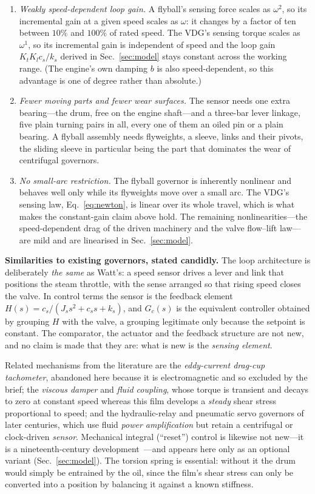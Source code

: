 \documentclass[conference]{IEEEtran}
\begin{document}
\begin{enumerate}
\item \emph{Weakly speed-dependent loop gain.} A flyball's sensing force scales as
$\omega^{2}$, so its incremental gain at a given speed scales as $\omega$: it
changes by a factor of ten between $10\%$ and $100\%$ of rated speed. The VDG's
sensing torque scales as $\omega^{1}$, so its incremental gain is independent of
speed and the loop gain $K_tK_lc_s/k_s$ derived in Sec.~\ref{sec:model} stays
constant across the working range. (The engine's own damping $b$ is also
speed-dependent, so this advantage is one of degree rather than absolute.)
\item \emph{Fewer moving parts and fewer wear surfaces.} The sensor needs one extra
bearing---the drum, free on the engine shaft---and a three-bar lever linkage, five
plain turning pairs in all, every one of them an oiled pin or a plain bearing. A
flyball assembly needs flyweights, a sleeve, links and their pivots, the sliding
sleeve in particular being the part that dominates the wear of centrifugal
governors.
\item \emph{No small-arc restriction.} The flyball governor is inherently nonlinear
and behaves well only while its flyweights move over a small arc. The VDG's sensing
law, Eq.~\eqref{eq:newton}, is linear over its whole travel, which is what makes the
constant-gain claim above hold. The remaining nonlinearities---the speed-dependent
drag of the driven machinery and the valve flow--lift law---are mild and are
linearised in Sec.~\ref{sec:model}.
\end{enumerate}

\textbf{Similarities to existing governors, stated candidly.} The loop architecture
is deliberately \emph{the same} as Watt's: a speed sensor drives a lever and link
that positions the steam throttle, with the sense arranged so that rising speed
closes the valve. In control terms the sensor is the feedback element
$H(s)=c_s/(J_ss^{2}+c_ss+k_s)$, and $G_c(s)$ is the equivalent controller obtained
by grouping $H$ with the valve, a grouping legitimate only because the setpoint is
constant. The comparator, the actuator and the feedback structure are not new, and
no claim is made that they are: what is new is the \emph{sensing element}.

Related mechanisms from the literature are the \emph{eddy-current drag-cup
tachometer}, abandoned here because it is electromagnetic and so excluded by the
brief; the \emph{viscous damper} and \emph{fluid coupling}, whose torque is
transient and decays to zero at constant speed whereas this film develops a
\emph{steady} shear stress proportional to speed; and the hydraulic-relay and
pneumatic servo governors of later centuries, which use fluid \emph{power
amplification} but retain a centrifugal or clock-driven \emph{sensor}. Mechanical
integral (``reset'') control is likewise not new---it is a nineteenth-century
development~\cite{bennett}---and appears here only as an optional variant
(Sec.~\ref{sec:model}). The torsion spring is essential: without it the drum would
simply be entrained by the oil, since the film's shear stress can only be converted
into a position by balancing it against a known stiffness.
\end{document}
